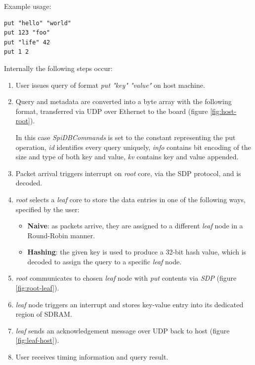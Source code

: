 Example usage:
\begin{lstlisting}
put "hello" "world"
put 123 "foo"
put "life" 42
put 1 2
\end{lstlisting}
 
Internally the following steps occur:
\begin{enumerate}
\item User issues query of format \textit{put "key" "value"} on host machine.
\item Query and metadata are converted into a byte array with the following format, transferred via UDP over Ethernet to the board (figure \ref{fig:host-root}).

In this case \textit{SpiDBCommands} is set to the constant representing the put operation, \textit{id} identifies every query uniquely, \textit{info} contains bit encoding of the size and type of both key and value, \textit{k\textunderscore v} contains key and value appended.
\item Packet arrival triggers interrupt on \textit{root} core, via the SDP protocol, and is decoded.
\item \textit{root} selects a \textit{leaf} core to store the data entries in one of the following ways, specified by the user:
\begin{itemize}
	\item \textbf{Naive}: as packets arrive, they are assigned to a different \textit{leaf} node in a Round-Robin manner.
	\item \textbf{Hashing}: the given key is used to produce a 32-bit hash value, which is decoded to assign the query to a specific \textit{leaf} node.
\end{itemize}
\item \textit{root} communicates to chosen \textit{leaf} node with \textit{put} contents via \textit{SDP} (figure \ref{fig:root-leaf}).
\item \textit{leaf} node triggers an interrupt and stores key-value entry into its dedicated region of SDRAM.
\item \textit{leaf} sends an acknowledgement message over UDP back to host (figure \ref{fig:leaf-host}).
\item User receives timing information and query result.
\end{enumerate}

